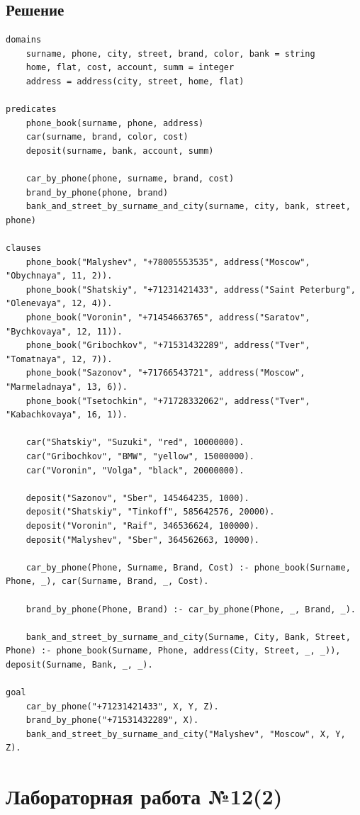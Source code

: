 \documentclass[12pt]{report}
\begin{document}
\newpage
\section*{Решение}
\begin{lstlisting}
domains
	surname, phone, city, street, brand, color, bank = string
	home, flat, cost, account, summ = integer
	address = address(city, street, home, flat)
		
predicates
	phone_book(surname, phone, address)
	car(surname, brand, color, cost)
	deposit(surname, bank, account, summ)
	
	car_by_phone(phone, surname, brand, cost)
	brand_by_phone(phone, brand)
	bank_and_street_by_surname_and_city(surname, city, bank, street, phone)
	
clauses
	phone_book("Malyshev", "+78005553535", address("Moscow", "Obychnaya", 11, 2)).
	phone_book("Shatskiy", "+71231421433", address("Saint Peterburg", "Olenevaya", 12, 4)).
	phone_book("Voronin", "+71454663765", address("Saratov", "Bychkovaya", 12, 11)).
	phone_book("Gribochkov", "+71531432289", address("Tver", "Tomatnaya", 12, 7)).
	phone_book("Sazonov", "+71766543721", address("Moscow", "Marmeladnaya", 13, 6)).
	phone_book("Tsetochkin", "+71728332062", address("Tver", "Kabachkovaya", 16, 1)).
	
	car("Shatskiy", "Suzuki", "red", 10000000).
	car("Gribochkov", "BMW", "yellow", 15000000).
	car("Voronin", "Volga", "black", 20000000).
	
	deposit("Sazonov", "Sber", 145464235, 1000).
	deposit("Shatskiy", "Tinkoff", 585642576, 20000).
	deposit("Voronin", "Raif", 346536624, 100000).
	deposit("Malyshev", "Sber", 364562663, 10000).
	
	car_by_phone(Phone, Surname, Brand, Cost) :- phone_book(Surname, Phone, _), car(Surname, Brand, _, Cost).
	
	brand_by_phone(Phone, Brand) :- car_by_phone(Phone, _, Brand, _).
	
	bank_and_street_by_surname_and_city(Surname, City, Bank, Street, Phone) :- phone_book(Surname, Phone, address(City, Street, _, _)), deposit(Surname, Bank, _, _).
		
goal
	car_by_phone("+71231421433", X, Y, Z).
	brand_by_phone("+71531432289", X).
	bank_and_street_by_surname_and_city("Malyshev", "Moscow", X, Y, Z).
\end{lstlisting}

\chapter*{Лабораторная работа №12(2)}
\end{document}
